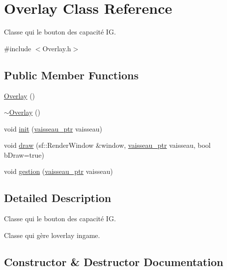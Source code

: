 \hypertarget{class_overlay}{}\section{Overlay Class Reference}
\label{class_overlay}


Classe qui le bouton des capacité IG.  




{\ttfamily \#include $<$Overlay.\+h$>$}

\subsection*{Public Member Functions}
\begin{DoxyCompactItemize}
\item 
\mbox{\hyperlink{class_overlay_ab4f509d502931bcaad03418470993d70}{Overlay}} ()
\item 
\mbox{\hyperlink{class_overlay_ad40a5e109ee4acbdec9f21d5496b7fa9}{$\sim$\+Overlay}} ()
\item 
void \mbox{\hyperlink{class_overlay_aa4efbb160fcafa1cf5c3e4b454c4cc3b}{init}} (\mbox{\hyperlink{def__type_8h_a03925a047830157ad843b4224e7f63ba}{vaisseau\+\_\+ptr}} vaisseau)
\item 
void \mbox{\hyperlink{class_overlay_a56719e5808fe4c5a2b6a1862a6a6110a}{draw}} (sf\+::\+Render\+Window \&window, \mbox{\hyperlink{def__type_8h_a03925a047830157ad843b4224e7f63ba}{vaisseau\+\_\+ptr}} vaisseau, bool b\+Draw=true)
\item 
void \mbox{\hyperlink{class_overlay_ab786c282e5e4bf0b583065b5cde9bd1c}{gestion}} (\mbox{\hyperlink{def__type_8h_a03925a047830157ad843b4224e7f63ba}{vaisseau\+\_\+ptr}} vaisseau)
\end{DoxyCompactItemize}


\subsection{Detailed Description}
Classe qui le bouton des capacité IG. 

Classe qui gère l\textquotesingle{}overlay ingame. 

\subsection{Constructor \& Destructor Documentation}
\mbox{\label{class_overlay_ab4f509d502931bcaad03418470993d70}} 
